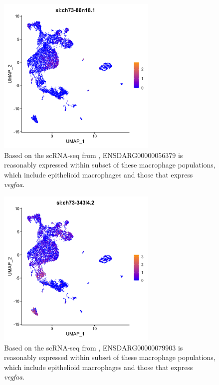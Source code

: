 \begin{figure}
\centering
\includegraphics[height=3in]{images/wtCombo_si:ch73-86n18.1_GEPlot.png
}
\caption[Single\hyp{}cell RNA\hyp{}seq expression profile for 56379]{Based on the scRNA\hyp{}seq from \citet{Cronan2021}, ENSDARG00000056379 is reasonably expressed within subset of these macrophage populations, which include epithelioid macrophages and those that express \textit{vegfaa}.}
\label{figure:sc56379}
\end{figure}

\begin{figure}
\centering
\includegraphics[height=3in]{images/wtCombo_si:ch73-343l4.2_GEPlot.png
}
\caption[Single\hyp{}cell RNA\hyp{}seq expression profile for 79903]{Based on the scRNA\hyp{}seq from \citet{Cronan2021}, ENSDARG00000079903 is reasonably expressed within subset of these macrophage populations, which include epithelioid macrophages and those that express \textit{vegfaa}.}
\label{figure:sc79903}
\end{figure}

